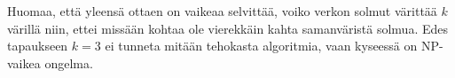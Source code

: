 Huomaa, että yleensä ottaen on vaikeaa
selvittää, voiko verkon solmut
värittää $k$ värillä niin,
ettei missään kohtaa ole vierekkäin
kahta samanväristä solmua.
Edes tapaukseen $k=3$ ei tunneta
mitään tehokasta algoritmia,
vaan kyseessä on NP-vaikea ongelma.
% 
% 
% 
% 
% 
% 

